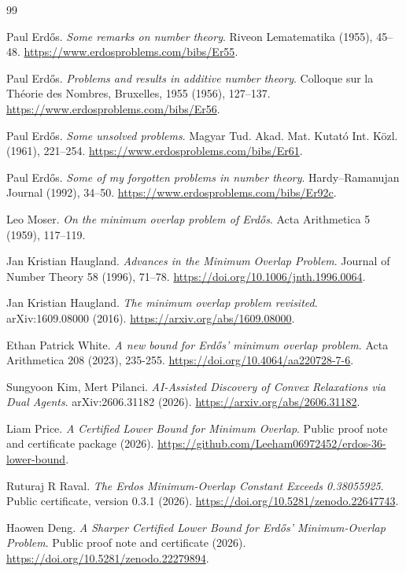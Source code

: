 \begin{thebibliography}{99}

 Paul Erd\H{o}s. \emph{Some remarks on number theory}. Riveon Lematematika (1955), 45--48. \url{https://www.erdosproblems.com/bibs/Er55}.

 Paul Erd\H{o}s. \emph{Problems and results in additive number theory}. Colloque sur la Th\'eorie des Nombres, Bruxelles, 1955 (1956), 127--137. \url{https://www.erdosproblems.com/bibs/Er56}.

 Paul Erd\H{o}s. \emph{Some unsolved problems}. Magyar Tud. Akad. Mat. Kutat\'o Int. K\"ozl. (1961), 221--254. \url{https://www.erdosproblems.com/bibs/Er61}.

 Paul Erd\H{o}s. \emph{Some of my forgotten problems in number theory}. Hardy--Ramanujan Journal (1992), 34--50. \url{https://www.erdosproblems.com/bibs/Er92c}.

 Leo Moser. \emph{On the minimum overlap problem of Erdős}. Acta Arithmetica 5 (1959), 117--119.

 Jan Kristian Haugland. \emph{Advances in the Minimum Overlap Problem}. Journal of Number Theory 58 (1996), 71--78. \url{https://doi.org/10.1006/jnth.1996.0064}.

 Jan Kristian Haugland. \emph{The minimum overlap problem revisited}. arXiv:1609.08000 (2016). \url{https://arxiv.org/abs/1609.08000}.

 Ethan Patrick White. \emph{A new bound for Erdős’ minimum overlap problem}. Acta Arithmetica 208 (2023), 235-255. \url{https://doi.org/10.4064/aa220728-7-6}.

 Sungyoon Kim, Mert Pilanci. \emph{AI-Assisted Discovery of Convex Relaxations via Dual Agents}. arXiv:2606.31182 (2026). \url{https://arxiv.org/abs/2606.31182}.

 Liam Price. \emph{A Certified Lower Bound for Minimum Overlap}. Public proof note and certificate package (2026). \url{https://github.com/Leeham06972452/erdos-36-lower-bound}.

 Ruturaj R Raval. \emph{The Erdos Minimum-Overlap Constant Exceeds 0.38055925}. Public certificate, version 0.3.1 (2026). \url{https://doi.org/10.5281/zenodo.22647743}.

 Haowen Deng. \emph{A Sharper Certified Lower Bound for Erdős’ Minimum-Overlap Problem}. Public proof note and certificate (2026). \url{https://doi.org/10.5281/zenodo.22279894}.


\end{thebibliography}
